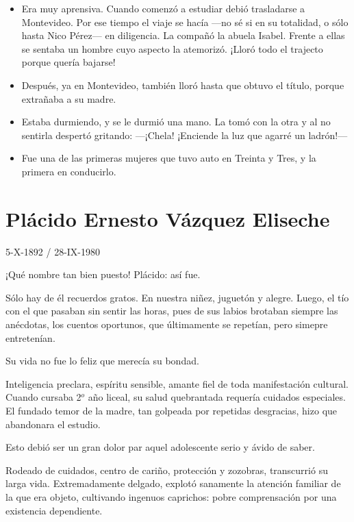 \documentclass[a4paper]{article}
\begin{document}
\begin{itemize}
    \item{Era muy aprensiva. Cuando comenzó a estudiar debió trasladarse a Montevideo. Por ese tiempo el viaje se hacía ---no sé si en su totalidad, o sólo hasta Nico Pérez--- en diligencia. La compañó la abuela Isabel. Frente a ellas se sentaba un hombre cuyo aspecto la atemorizó. ¡Lloró todo el trajecto porque quería bajarse!}
    \item{Después, ya en Montevideo, también lloró hasta que obtuvo el título, porque extrañaba a su madre.}
    \item{Estaba durmiendo, y se le durmió una mano. La tomó con la otra y al  no sentirla despertó gritando: ---¡Chela! ¡Enciende la luz que agarré un ladrón!---}
    \item{Fue una de las primeras mujeres que tuvo auto en Treinta y Tres, y la primera en conducirlo.}
\end{itemize}

\section{Plácido Ernesto Vázquez Eliseche}

5-X-1892 / 28-IX-1980

\bigbreak{}

¡Qué nombre tan bien puesto! Plácido: así fue.

Sólo hay de él recuerdos gratos. En nuestra niñez, juguetón y alegre. Luego, el tío con el que pasaban sin sentir las horas, pues de sus labios brotaban siempre las anécdotas, los cuentos oportunos, que últimamente se repetían, pero simepre entretenían.

Su vida no fue lo feliz que merecía su bondad.

Inteligencia preclara, espíritu sensible, amante fiel de toda manifestación cultural. Cuando cursaba 2$^o$ año liceal, su salud quebrantada requería cuidados especiales. El fundado temor de la madre, tan golpeada por repetidas desgracias, hizo que abandonara el estudio.

Esto debió ser un gran dolor par aquel adolescente serio y ávido de saber.

Rodeado de cuidados, centro de cariño, protección y zozobras, transcurrió su larga vida. Extremadamente delgado, explotó sanamente la atención familiar de la que era objeto, cultivando ingenuos caprichos: pobre comprensación por una existencia dependiente.
\end{document}
